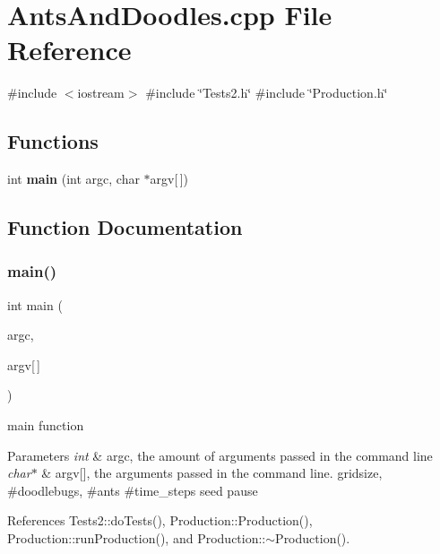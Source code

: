 \section{Ants\+And\+Doodles.\+cpp File Reference}
\label{AntsAndDoodles_8cpp}
{\ttfamily \#include $<$iostream$>$}\newline
{\ttfamily \#include \char`\"{}Tests2.\+h\char`\"{}}\newline
{\ttfamily \#include \char`\"{}Production.\+h\char`\"{}}\newline
\subsection*{Functions}
\begin{DoxyCompactItemize}
\item 
int \textbf{ main} (int argc, char $\ast$argv[$\,$])
\end{DoxyCompactItemize}


\subsection{Function Documentation}
\mbox{\label{AntsAndDoodles_8cpp_a0ddf1224851353fc92bfbff6f499fa97}} 
\subsubsection{main()}
{\footnotesize\ttfamily int main (\begin{DoxyParamCaption}\item[{int}]{argc,  }\item[{char $\ast$}]{argv[$\,$] }\end{DoxyParamCaption})}

main function 
\begin{DoxyParams}{Parameters}
{\em int} & argc, the amount of arguments passed in the command line \\
\hline
{\em char$\ast$} & argv[], the arguments passed in the command line. gridsize, \#doodlebugs, \#ants \#time\+\_\+steps seed pause \\
\hline
\end{DoxyParams}


References Tests2\+::do\+Tests(), Production\+::\+Production(), Production\+::run\+Production(), and Production\+::$\sim$\+Production().

